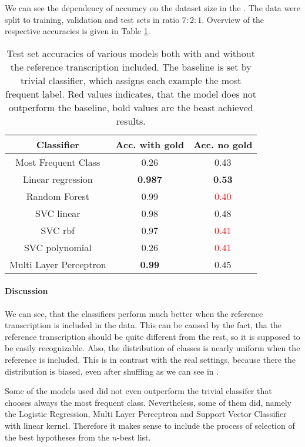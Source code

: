 We can see the dependency of accuracy on the dataset size in the .
The data were split to training, validation and test sets in ratio $7:2:1$.
Overview of the respective accuracies is given in Table \ref{tabacc}.
\begin{table}
\begin{center}
\begin{tabular}{ |c|c|c| } 
 \hline
 \textbf{Classifier} & \textbf{Acc. with gold} & \textbf{Acc. no gold} \\ \hline
 Most Frequent Class & 0.26 & 0.43 \\ \hline 
 Linear regression & \textbf{0.987} & \textbf{0.53} \\ \hline
 Random Forest & 0.99 & \textcolor{red}{0.40}\\ \hline
 SVC linear & 0.98 & 0.48 \\ \hline
 SVC rbf & 0.97 & \textcolor{red}{0.41} \\ \hline
 SVC polynomial & 0.26 & \textcolor{red}{0.41} \\ \hline
 Multi Layer Perceptron & \textbf{0.99} & 0.45 \\ \hline
 \end{tabular}
\end{center}
\label{tabacc}
\caption{Test set accuracies of various models both with and without the reference transcription included. The baseline is set by trivial classifier, which assigns each example the most frequent label. Red values indicates, that the model does not outperform the baseline, bold values are the beast achieved results.}
\end{table}
\paragraph{Discussion}
We can see, that the classifiers perform much better when the reference transcription is included in the data.
This can be caused by the fact, tha the reference transcription should be quite different from the rest, so it is supposed to be easily recognizable.
Also, the distribution of classes is nearly uniform when the reference is included.
This is in contrast with the real settings, because there the distribution is biased, even after shuffling as we can see in .
\par
Some of the models used did not even outperform the trivial classifer that chooses always the most frequent class.
Nevertheless, some of them did, namely the Logistic Regression, Multi Layer Perceptron and Support Vector Classifier with linear kernel.
Therefore it makes sense to include the process of selection of the best hypotheses from the $n$-best list.
